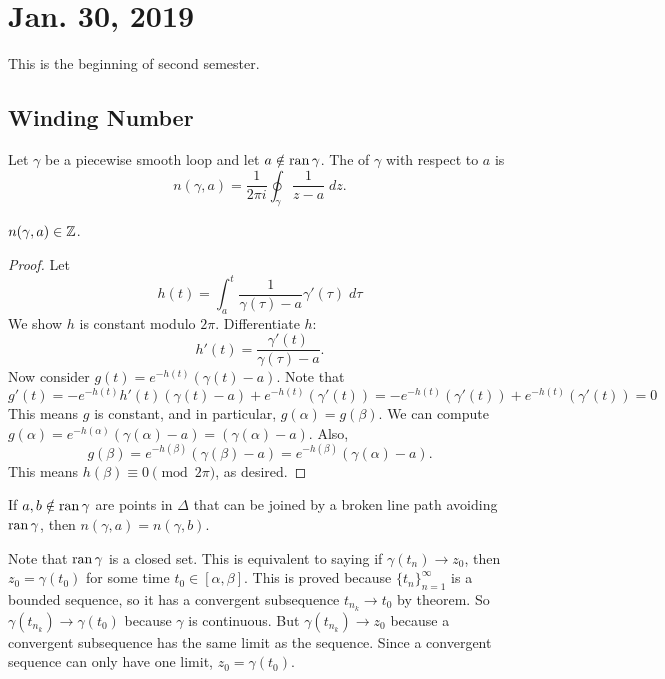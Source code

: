 \section{Jan. 30, 2019}
This is the beginning of second semester.

\subsection{Winding Number}

\begin{definition}
    Let $\gamma$ be a piecewise smooth loop and let
    $a \notin \operatorname{ran}{\gamma}$.
    The  of $\gamma$ with respect to $a$ is
    \[ n(\gamma, a) = \frac{1}{2\pi i} \oint_{\gamma} \frac{1}{z-a} \; dz. \]
\end{definition}

\begin{theorem}
    $n(\gamma, a) \in \operatorname{\mathbb{Z}}$.
\end{theorem}

\begin{proof}
    Let
    \[ h(t) = \int_a^t \frac{1}{\gamma(\tau)-a}\gamma'(\tau) \; d\tau \]
    We show $h$ is constant modulo $2\pi$.
    Differentiate $h$: 
    \[ h'(t) = \frac{\gamma'(t)}{\gamma(\tau) -a}. \]
    Now consider $g(t) = e^{-h(t)} (\gamma(t) - a)$.
    Note that
    \[ g'(t) = -e^{-h(t)} h'(t) (\gamma(t) - a) + 
        e^{-h(t)} (\gamma'(t))
    = -e^{-h(t)} (\gamma'(t)) +  e^{-h(t)} (\gamma'(t)) = 0 \]
    This means $g$ is constant, and in particular, $g(\alpha) = g(\beta)$.
    We can compute $g(\alpha) = e^{-h(\alpha)} (\gamma(\alpha) - a) = (\gamma(\alpha) - a)$.
    Also, 
    \[ g(\beta) = e^{-h(\beta)}(\gamma(\beta) - a) = e^{-h(\beta)}
    (\gamma(\alpha) - a). \]
    This means $h(\beta) \equiv 0 \pmod{2\pi}$, as desired. 
\end{proof}


\begin{cor}
    If $a,b \notin {\operatorname{ran}} \,  \gamma$ are points in $\Delta$ that can be joined by a broken line path avoiding ${\operatorname{ran}} \, \gamma$, then $n(\gamma, a) = n(\gamma, b)$.
\end{cor}

Note that ${\operatorname{ran}} \, \gamma$ is a closed set.  
This is equivalent to saying if $\gamma (t_n) \to z_0$, then $z_0 = \gamma(t_0)$ for some time $t_0 \in [\alpha, \beta]$.
This is proved because $\{ t_n \}_{n=1}^{\infty}$ is a bounded sequence, so it has a convergent subsequence $t_{n_k} \to t_0$ by  theorem.
So $\gamma(t_{n_k}) \to \gamma(t_0)$ because $\gamma$ is continuous.
But $\gamma(t_{n_k}) \to z_0$ because a convergent subsequence has the same limit as the sequence.
Since a convergent sequence can only have one limit, $z_0 = \gamma(t_0)$.

